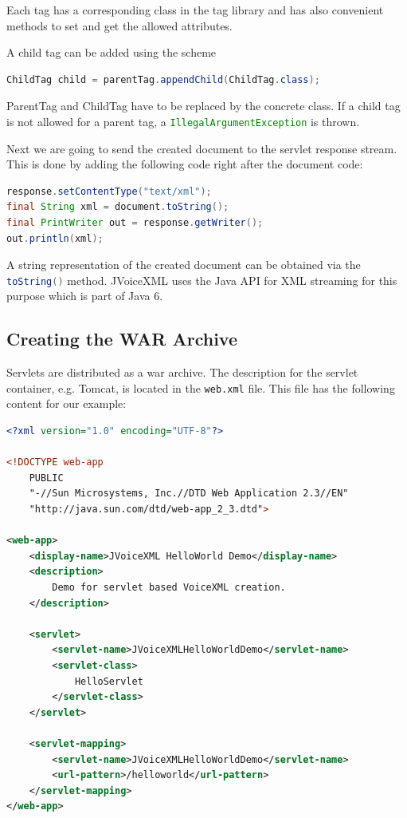 \documentclass[11pt,a4paper]{book}
\begin{document}
Each tag has a corresponding class in the tag library and has also convenient
methods to set and get the allowed attributes.

A child tag can be added using the scheme
\begin{lstlisting}[language=Java]
ChildTag child = parentTag.appendChild(ChildTag.class);
\end{lstlisting}

ParentTag and ChildTag have to be replaced by the concrete class. If a child
tag is not allowed for a parent tag, a \lstinline[language=Java]{IllegalArgumentException} is
thrown.

Next we are going to send the created document to the servlet response stream.
This is done by adding the following code right after the document code:

\begin{lstlisting}[language=Java]
response.setContentType("text/xml");
final String xml = document.toString();
final PrintWriter out = response.getWriter();
out.println(xml);
\end{lstlisting}

A string representation of the created document can be obtained via the
\lstinline[language=Java]{toString()} method. JVoiceXML uses the Java API for
XML streaming for this purpose which is part of Java 6.

\subsection{Creating the WAR Archive}

Servlets are distributed as a war archive. The description for the servlet
container, e.g. Tomcat, is located in the \texttt{web.xml} file.
This file has the following content for our example:

\begin{lstlisting}[language=XML]
<?xml version="1.0" encoding="UTF-8"?>

<!DOCTYPE web-app
    PUBLIC
    "-//Sun Microsystems, Inc.//DTD Web Application 2.3//EN"
    "http://java.sun.com/dtd/web-app_2_3.dtd">

<web-app>
    <display-name>JVoiceXML HelloWorld Demo</display-name>
    <description>
        Demo for servlet based VoiceXML creation.
    </description>

    <servlet>
        <servlet-name>JVoiceXMLHelloWorldDemo</servlet-name>
        <servlet-class>
            HelloServlet
        </servlet-class>
    </servlet>

    <servlet-mapping>
        <servlet-name>JVoiceXMLHelloWorldDemo</servlet-name>
        <url-pattern>/helloworld</url-pattern>
    </servlet-mapping>
</web-app>
\end{lstlisting}
\end{document}
